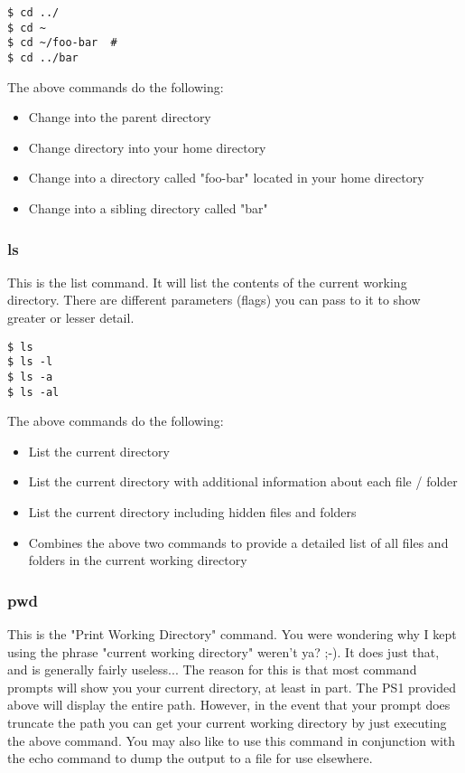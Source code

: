 \begin{lstlisting}
$ cd ../
$ cd ~ 
$ cd ~/foo-bar	#
$ cd ../bar
\end{lstlisting}
	
The above commands do the following:
	\begin{itemize}
		\item Change into the parent directory
		\item Change directory into your home directory
		\item Change into a directory called "foo-bar" located in your home directory
		\item Change into a sibling directory called "bar"
	\end{itemize}

\subsubsection{ls} \mdseries
This is the list command.  It will list the contents of the current working directory.  There are different parameters (flags) you can pass to it to show greater or lesser detail.
	
\begin{lstlisting}
$ ls
$ ls -l
$ ls -a
$ ls -al
\end{lstlisting}
	
The above commands do the following:
	\begin{itemize}
		\item List the current directory
		\item List the current directory with additional information about each file / folder
		\item List the current directory including hidden files and folders
		\item Combines the above two commands to provide a detailed list of all files and folders in the current working directory
	\end{itemize}

\subsubsection{pwd} \mdseries
This is the "Print Working Directory" command.  You were wondering why I kept using the phrase "current working directory" weren't ya? ;-).  It does just that, and is generally fairly useless...  The reason for this is that most command prompts will show you your current directory, at least in part.  The PS1 provided above will display the entire path.  However, in the event that your prompt does truncate the path you can get your current working directory by just executing the above command.  You may also like to use this command in conjunction with the echo command to dump the output to a file for use elsewhere.

